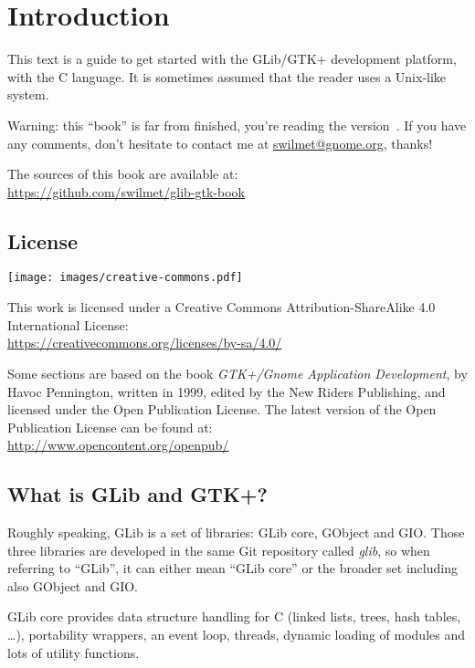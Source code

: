 \chapter{Introduction}

This text is a guide to get started with the GLib/GTK+ development platform, with the C language. It is sometimes assumed that the reader uses a Unix-like system.

Warning: this ``book'' is far from finished, you're reading the version~\bookversion. If you have any comments, don't hesitate to contact me at \url{swilmet@gnome.org}, thanks!

The sources of this book are available at:\\
\url{https://github.com/swilmet/glib-gtk-book}

\section{License}
\label{intro-license}

\begin{center}
  \texttt{[image: images/creative-commons.pdf]}
\end{center}

This work is licensed under a Creative Commons Attribution-ShareAlike 4.0 International License:\\
\url{https://creativecommons.org/licenses/by-sa/4.0/}

Some sections are based on the book \emph{GTK+/Gnome Application Development}, by Havoc Pennington, written in 1999, edited by the New Riders Publishing, and licensed under the Open Publication License. The latest version of the Open Publication License can be found at:\\
\url{http://www.opencontent.org/openpub/}

\section{What is GLib and GTK+?}

Roughly speaking, GLib is a set of libraries: GLib core, GObject and GIO. Those three libraries are developed in the same Git repository called \emph{glib}, so when referring to ``GLib'', it can either mean ``GLib core'' or the broader set including also GObject and GIO.

GLib core provides data structure handling for C (linked lists, trees, hash tables, …), portability wrappers, an event loop, threads, dynamic loading of modules and lots of utility functions.

